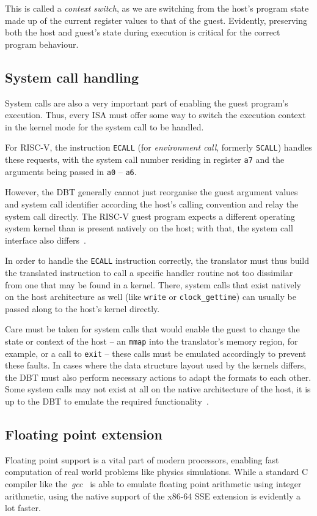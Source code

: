 This is called a \textit{context switch}, as we are switching from the host's program state made up of the current register values to that of the guest.
Evidently, preserving both the host and guest's state during execution is critical for the correct program behaviour.

\subsection{System call handling}
\label{sec:syscall-handling}
System calls are also a very important part of enabling the guest program's execution.
Thus, every ISA must offer some way to switch the execution context in the kernel mode for the system call to be handled.

For RISC-V, the instruction \texttt{ECALL} (for \textit{environment call}, formerly \texttt{SCALL}) handles these requests, with the system call number residing in register \texttt{a7} and the arguments being passed in \texttt{a0} -- \texttt{a6}.

However, the DBT generally cannot just reorganise the guest argument values and system call identifier according the host's calling convention and relay the system call directly.
The RISC-V guest program expects a different operating system kernel than is present natively on the host;
with that, the system call interface also differs~\cite[S. 2f.]{bintrans}.

In order to handle the \texttt{ECALL} instruction correctly, the translator must thus build the translated instruction to call a specific handler routine not too dissimilar from one that may be found in a kernel.
There, system calls that exist natively on the host architecture as well (like \texttt{write} or \texttt{clock\_gettime}) can usually be passed along to the host's kernel directly.

Care must be taken for system calls that would enable the guest to change the state or context of the host -- an \texttt{mmap} into the translator's memory region, for example, or a call to \texttt{exit} -- these calls must be emulated accordingly to prevent these faults.
In cases where the data structure layout used by the kernels differs, the DBT must also perform necessary actions to adapt the formats to each other.
Some system calls may not exist at all on the native architecture of the host, it is up to the DBT to emulate the required functionality~\cite[S. 2f.]{bintrans}.

\subsection{Floating point extension}
\label{subsec:fp_extension}
Floating point support is a vital part of modern processors, enabling fast computation of real world problems like physics simulations.
While a standard C compiler like the~\textit{gcc}~\cite{gcc-web} is able to emulate floating point arithmetic using integer arithmetic, using the native support of the x86-64 SSE extension is evidently a lot faster.

